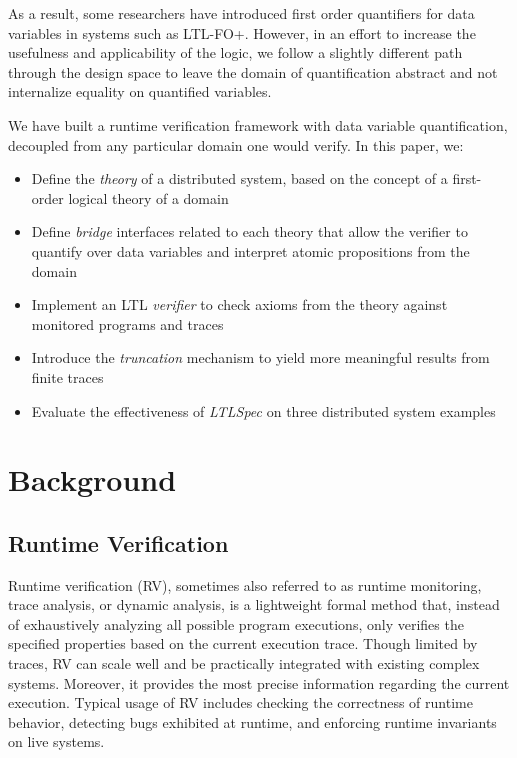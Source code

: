\documentclass[format=acmsmall, nonacm=true, review=true, screen=true]{acmart}
\newcommand{\ltlspec}{\textit{LTLSpec}\xspace}
\begin{document}
As a result, some researchers have introduced first order quantifiers for data variables \cite{khoury_automata-based_2021,margaria_execution_2016,halle_runtime_2012} in systems such as LTL-FO+.
However, in an effort to increase the usefulness and applicability of the logic, we follow a slightly different path through the design space to leave the domain of quantification abstract and not internalize equality on quantified variables.

We have built a runtime verification framework with data variable quantification, decoupled from any particular domain one would verify.
In this paper, we:
\begin{itemize}
  \item Define the \textit{theory} of a distributed system, based on the concept of a first-order logical theory of a domain
  \item Define \textit{bridge} interfaces related to each theory that allow the verifier to quantify over data variables and interpret atomic propositions from the domain
  \item Implement an LTL \textit{verifier} to check axioms from the theory against monitored programs and traces
  \item Introduce the \textit{truncation} mechanism to yield more meaningful results from finite traces
  \item Evaluate the effectiveness of \ltlspec on three distributed system examples
\end{itemize}

\section{Background}
\subsection{Runtime Verification}
Runtime verification (RV), sometimes also referred to as runtime monitoring, trace analysis, or dynamic analysis, is a lightweight formal method that, instead of exhaustively analyzing all possible program executions, only verifies the specified properties based on the current execution trace. Though limited by traces, RV can scale well and be practically integrated with existing complex systems. Moreover, it provides the most precise information regarding the current execution. Typical usage of RV includes checking the correctness of runtime behavior, detecting bugs exhibited at runtime, and enforcing runtime invariants on live systems.
\end{document}
